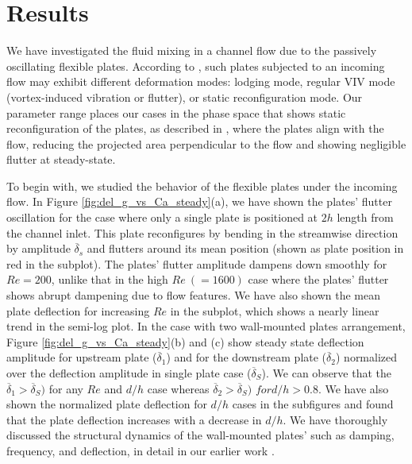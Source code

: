 \documentclass[reprint,a4paper,fleqn]{cas-dc} %
\begin{document}
		\section{Results}
		
		We have investigated the fluid mixing in a channel flow due to the passively oscillating flexible plates. According to \cite{Zhang2020}, such plates subjected to an incoming flow may exhibit different deformation modes: lodging mode, regular VIV mode (vortex-induced vibration or flutter), or static reconfiguration mode. Our parameter range places our cases in the phase space that shows static reconfiguration of the plates, as described in \cite{Zhang2020}, where the plates align with the flow, reducing the projected area perpendicular to the flow and showing negligible flutter at steady-state.
		
		To begin with, we studied the behavior of the flexible plates under the incoming flow. 
		In Figure \ref{fig:del_g_vs_Ca_steady}(a), we have shown the plates' flutter oscillation for the case where only a single plate is positioned at $2h$ length from the channel inlet. This plate reconfigures by bending in the streamwise direction by amplitude $\overline{\delta}_s$ and flutters around its mean position (shown as plate position in red in the subplot). The plates' flutter amplitude dampens down smoothly for $Re=200$, unlike that in the high $Re ~(=1600)$ case where the plates' flutter shows abrupt dampening due to flow features. We have also shown the mean plate deflection for increasing $Re$ in the subplot, which shows a nearly linear trend in the semi-log plot. In the case with two wall-mounted plates arrangement, Figure \ref{fig:del_g_vs_Ca_steady}(b) and (c) show steady state deflection amplitude for upstream plate ($\overline{\delta}_1$) and for the downstream plate ($\overline{\delta}_2$) normalized over the deflection amplitude in single plate case ($\overline{\delta}_S$). We can observe that the $\overline{\delta}_1 > \overline{\delta}_S)$ for any $Re$ and $d/h$ case whereas $\overline{\delta}_2 > \overline{\delta}_S)$ $for d/h>0.8$. We have also shown the normalized plate deflection for $d/h$ cases in the subfigures and found that the plate deflection increases with a decrease in $d/h$. We have thoroughly discussed the structural dynamics of the wall-mounted plates' such as damping, frequency, and deflection, in detail in our earlier work \citep{Self2019}.
		
\end{document}
